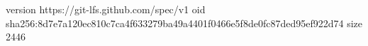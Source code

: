 version https://git-lfs.github.com/spec/v1
oid sha256:8d7e7a120ec810c7ca4f633279ba49a4401f0466e5f8de0fc87ded95ef922d74
size 2446
